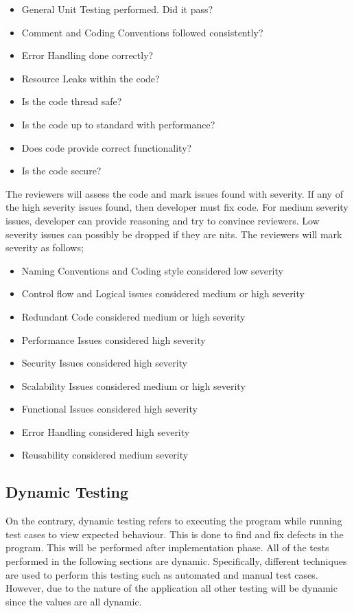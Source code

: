 \documentclass[12pt]{article}
\begin{document}
\begin{itemize}
 \item General Unit Testing performed. Did it pass?
 \item Comment and Coding Conventions followed consistently?
 \item Error Handling done correctly?
 \item Resource Leaks within the code?
 \item Is the code thread safe?
 \item Is the code up to standard with performance?
 \item Does code provide correct functionality?
 \item Is the code secure?
 \end{itemize}
The reviewers will assess the code and mark issues found with severity. If any of the high severity issues found, then developer must fix code. For medium severity issues, developer can provide reasoning and try to convince reviewers. Low severity issues can possibly be dropped if they are nits. The reviewers will mark severity as follows;
\begin{itemize}
\item Naming Conventions and Coding style considered low severity
\item Control flow and Logical issues considered medium or high severity
\item Redundant Code considered medium or high severity
\item Performance Issues considered high severity
\item Security Issues considered high severity
\item Scalability Issues considered medium or high severity
\item Functional Issues considered high severity
\item Error Handling considered high severity
\item Reusability considered medium severity
\end{itemize}

\subsection{Dynamic Testing}
On the contrary, dynamic testing refers to executing the program while running test cases to view expected behaviour. This is done to find and fix defects in the program. This will be performed after implementation phase. All of the tests performed in the following sections are dynamic. Specifically, different techniques are used to perform this testing such as automated and manual test cases. However, due to the nature of the application all other testing will be dynamic since the values are all dynamic.
\end{document}

